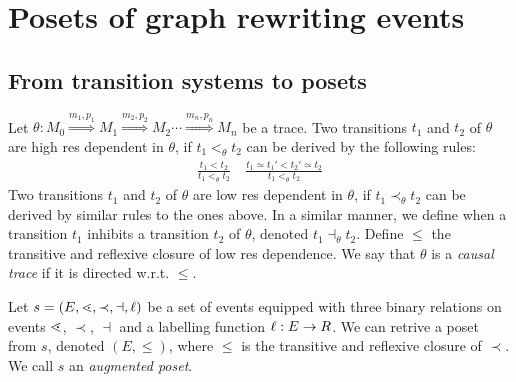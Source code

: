 \section{Posets of graph rewriting events}

\subsection{From transition systems to posets}

\begin{definition}
  \label{def:causal_trace}
  Let $\theta:M_0\overset{m_1,p_1}{\Rightarrow} M_1\overset{m_2,p_2}{\Rightarrow} M_2 \cdots \overset{m_n,p_n}{\Rightarrow} M_n$ be a trace.
  Two transitions $t_1$ and $t_2$ of $\theta$ are high res dependent in $\theta$, if $t_1<_{\theta} t_2$ can be derived by the following rules:
  \begin{align*}
    \frac{t_1 < t_2}{t_1 <_{\theta} t_2}\quad
    \frac{t_1\simeq t_1'<t_2'\simeq t_2}{t_1 <_{\theta} t_2}
  \end{align*}
  Two transitions $t_1$ and $t_2$ of $\theta$ are low res dependent in $\theta$, if $t_1\prec_{\theta} t_2$ can be derived by similar rules to the ones above. In a similar manner, we define when a transition $t_1$ inhibits a transition $t_2$ of $\theta$, denoted $t_1\dashv_{\theta} t_2$.
  Define $\leq$ the transitive and reflexive closure of low res dependence. We say that $\theta$ is a \emph{causal trace} if it is directed w.r.t. $\leq$.
\end{definition}

\begin{definition}
  Let $s=(E,\lessdot,\prec,\dashv,\ell)$ be a set of events equipped with three binary relations on events $\lessdot$, $\prec$, $\dashv$ and a labelling function $\ell:E\to R$. We can retrive a poset from $s$, denoted $(E,\leq)$, where $\leq$ is the transitive and reflexive closure of $\prec$.
  We call $s$ an \emph{augmented poset}.
\end{definition}

